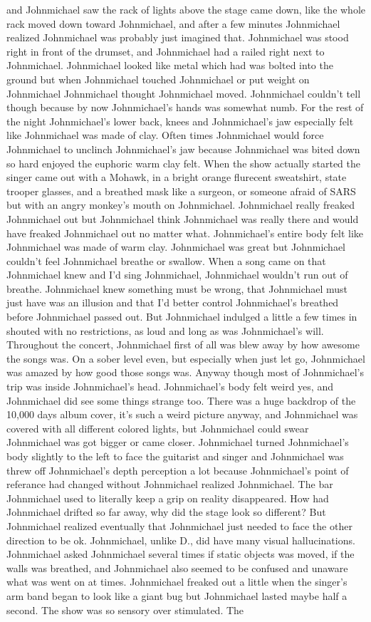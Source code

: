 \documentclass[12pt]{book}
\begin{document}
and Johnmichael saw the rack of lights above the stage came down, like the whole rack moved down toward Johnmichael, and after a few minutes Johnmichael realized Johnmichael was probably just imagined that. Johnmichael was stood right in front of the drumset, and Johnmichael had a railed right next to Johnmichael. Johnmichael looked like metal which had was bolted into the ground but when Johnmichael touched Johnmichael or put weight on Johnmichael Johnmichael thought Johnmichael moved. Johnmichael couldn't tell though because by now Johnmichael's hands was somewhat numb. For the rest of the night Johnmichael's lower back, knees and Johnmichael's jaw especially felt like Johnmichael was made of clay. Often times Johnmichael would force Johnmichael to unclinch Johnmichael's jaw because Johnmichael was bited down so hard enjoyed the euphoric warm clay felt. When the show actually started the singer came out with a Mohawk, in a bright orange flurecent sweatshirt, state trooper glasses, and a breathed mask like a surgeon, or someone afraid of SARS but with an angry monkey's mouth on Johnmichael. Johnmichael really freaked Johnmichael out but Johnmichael think Johnmichael was really there and would have freaked Johnmichael out no matter what. Johnmichael's entire body felt like Johnmichael was made of warm clay. Johnmichael was great but Johnmichael couldn't feel Johnmichael breathe or swallow. When a song came on that Johnmichael knew and I'd sing Johnmichael, Johnmichael wouldn't run out of breathe. Johnmichael knew something must be wrong, that Johnmichael must just have was an illusion and that I'd better control Johnmichael's breathed before Johnmichael passed out. But Johnmichael indulged a little a few times in shouted with no restrictions, as loud and long as was Johnmichael's will. Throughout the concert, Johnmichael first of all was blew away by how awesome the songs was. On a sober level even, but especially when just let go, Johnmichael was amazed by how good those songs was. Anyway though most of Johnmichael's trip was inside Johnmichael's head. Johnmichael's body felt weird yes, and Johnmichael did see some things strange too. There was a huge backdrop of the 10,000 days album cover, it's such a weird picture anyway, and Johnmichael was covered with all different colored lights, but Johnmichael could swear Johnmichael was got bigger or came closer. Johnmichael turned Johnmichael's body slightly to the left to face the guitarist and singer and Johnmichael was threw off Johnmichael's depth perception a lot because Johnmichael's point of referance had changed without Johnmichael realized Johnmichael. The bar Johnmichael used to literally keep a grip on reality disappeared. How had Johnmichael drifted so far away, why did the stage look so different? But Johnmichael realized eventually that Johnmichael just needed to face the other direction to be ok. Johnmichael, unlike D., did have many visual hallucinations. Johnmichael asked Johnmichael several times if static objects was moved, if the walls was breathed, and Johnmichael also seemed to be confused and unaware what was went on at times. Johnmichael freaked out a little when the singer's arm band began to look like a giant bug but Johnmichael lasted maybe half a second. The show was so sensory over stimulated. The 
\end{document}
